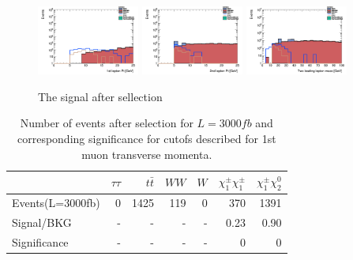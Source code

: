 \documentclass[tightenline,notitlepage,nofootinbib]{revtex4-1}
\begin{document}
\begin{figure}[!ht]
  \centering
  \includegraphics[width=0.3\textwidth]{h_PtMuons1st_2lead.png}
  \includegraphics[width=0.3\textwidth]{h_PtMuons2nd_2lead.png}
  \includegraphics[width=0.3\textwidth]{h_llmass_2lead.png}
  \caption{The signal after sellection}
\end{figure}


\begin{table}
  \setlength{\tabcolsep}{12pt}
  \centering
  \begin{tabular}{l|rrrrrr}
    & $\tau \tau$ & $t \bar t$ & $WW$ & $W$ & $\chi_1^{\pm} \chi_1^{\pm}$ &  $\chi_1^{\pm} \chi_2^0$ \\
    \hline
    Events(L=3000fb) & 0 & 1425 & 119 & 0 & 370 & 1391 \\
    Signal/BKG & - & - & - & - & 0.23 & 0.90 \\
    Significance & - & - & - & - & 0 & 0 
  \end{tabular}
  \caption{Number of events after selection for $L=3000fb$ and corresponding significance for cutofs described for 1st muon transverse momenta. }
\end{table}
\end{document}
